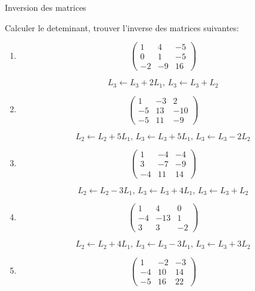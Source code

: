 \documentclass{article}
\begin{document}
\begin{center}
{\Large Inversion des matrices}\\
\end{center}


\noindent

\noindent
Calculer le deteminant, trouver l'inverse des matrices suivantes:


\begin{enumerate}



\item
$$ \begin{pmatrix}
1 & 4 & -5 \\ 
0 & 1 & -5 \\ 
-2 & -9 & 16
\end{pmatrix} $$


$$ L_3 \leftarrow L_3 + 2L_1,\, 
L_3 \leftarrow L_3 + L_2 $$
\item
$$ \begin{pmatrix}
1 & -3 & 2 \\ 
-5 & 13 & -10 \\ 
-5 & 11 & -9
\end{pmatrix} $$


$$ L_2 \leftarrow L_2 + 5L_1,\, 
L_3 \leftarrow L_3 + 5L_1,\, 
L_3 \leftarrow L_3 - 2L_2 $$
\item
$$ \begin{pmatrix}
1 & -4 & -4 \\ 
3 & -7 & -9 \\ 
-4 & 11 & 14
\end{pmatrix} $$


$$ L_2 \leftarrow L_2 - 3L_1,\, 
L_3 \leftarrow L_3 + 4L_1,\, 
L_3 \leftarrow L_3 + L_2 $$
\item
$$ \begin{pmatrix}
1 & 4 & 0 \\ 
-4 & -13 & 1 \\ 
3 & 3 & -2
\end{pmatrix} $$


$$ L_2 \leftarrow L_2 + 4L_1,\, 
L_3 \leftarrow L_3 - 3L_1,\, 
L_3 \leftarrow L_3 + 3L_2 $$
\item
$$ \begin{pmatrix}
1 & -2 & -3 \\ 
-4 & 10 & 14 \\ 
-5 & 16 & 22
\end{pmatrix} $$


\end{enumerate}
\end{document}
